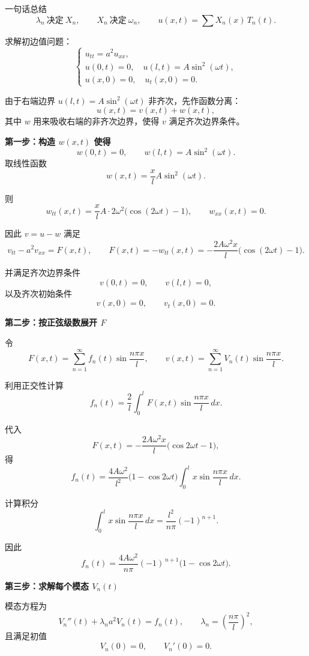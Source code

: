 \begin{note}{一句话总结}{}
\[
\boxed{
\lambda_n \ \text{决定}\ X_n,\qquad
X_n \ \text{决定}\ \omega_n,\qquad
u(x,t)=\sum X_n(x)\,T_n(t).
}
\]
\end{note}
\begin{homework}[2]
求解初边值问题：
\[
\begin{cases}
u_{tt}=a^{2}u_{xx},\\[3pt]
u(0,t)=0,\quad u(l,t)=A\sin^{2}(\omega t),\\[3pt]
u(x,0)=0,\quad u_t(x,0)=0.
\end{cases}
\]
\end{homework}
\begin{solution}
由于右端边界 $u(l,t)=A\sin^{2}(\omega t)$ 非齐次，先作函数分离：
\[
u(x,t)=v(x,t)+w(x,t),
\]
其中 $w$ 用来吸收右端的非齐次边界，使得 $v$ 满足齐次边界条件。

\medskip
\noindent\textbf{第一步：构造 $w(x,t)$ 使得}
\[
w(0,t)=0,\qquad w(l,t)=A\sin^{2}(\omega t).
\]
取线性函数
\[
w(x,t)=\frac{x}{l}A\sin^{2}(\omega t).
\]

则
\[
w_{tt}(x,t)=\frac{x}{l}A\cdot 2\omega^{2}\bigl(\cos(2\omega t)-1\bigr),
\qquad
w_{xx}(x,t)=0.
\]

因此 $v=u-w$ 满足
\[
v_{tt}-a^{2}v_{xx}=F(x,t),
\qquad
F(x,t)=-w_{tt}(x,t)=
 -\frac{2A\omega^{2}x}{l}\bigl(\cos(2\omega t)-1\bigr).
\]

并满足齐次边界条件
\[
v(0,t)=0,\qquad v(l,t)=0,
\]
以及齐次初始条件
\[
v(x,0)=0,\qquad v_t(x,0)=0.
\]

\medskip
\noindent\textbf{第二步：按正弦级数展开 $F$}

令
\[
F(x,t)=\sum_{n=1}^{\infty} f_n(t)\sin\frac{n\pi x}{l},
\qquad
v(x,t)=\sum_{n=1}^{\infty} V_n(t)\sin\frac{n\pi x}{l}.
\]

利用正交性计算
\[
f_n(t)=\frac{2}{l}\int_0^l F(x,t)\sin\frac{n\pi x}{l}\,dx.
\]

代入
\[
F(x,t)= -\frac{2A\omega^{2}x}{l}\bigl(\cos 2\omega t -1 \bigr),
\]
得
\[
f_n(t)=\frac{4A\omega^{2}}{l^{2}}\bigl(1-\cos 2\omega t\bigr)
\int_{0}^{l} x\sin\frac{n\pi x}{l}\,dx.
\]

计算积分
\[
\int_0^{l} x\sin\frac{n\pi x}{l}\,dx
= \frac{l^{2}}{n\pi}(-1)^{n+1}.
\]

因此
\[
f_n(t)=\frac{4A\omega^{2}}{n\pi}(-1)^{\,n+1}
\bigl(1-\cos 2\omega t\bigr).
\]

\medskip
\noindent\textbf{第三步：求解每个模态 $V_n(t)$}

模态方程为
\[
V_n''(t)+\lambda_n a^{2} V_n(t)=f_n(t),
\qquad
\lambda_n=\left(\frac{n\pi}{l}\right)^2,
\]
且满足初值
\[
V_n(0)=0,\qquad V_n'(0)=0.
\]


\end{solution}

